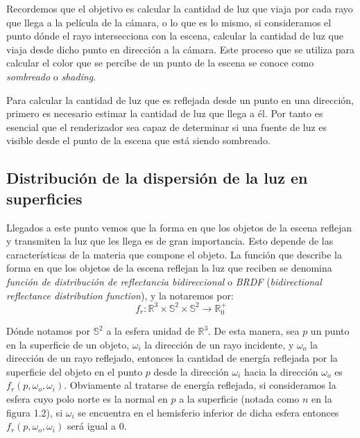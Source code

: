 Recordemos que el objetivo es calcular la cantidad de luz que viaja por cada rayo que llega a la película de la cámara, o lo que es lo mismo, si consideramos el punto dónde el rayo intersecciona con la escena, calcular la cantidad de luz que viaja desde dicho punto en dirección a la cámara. Este proceso que se utiliza para calcular el color que se percibe de un punto de la escena se conoce como \emph{sombreado} o \emph{shading}.

Para calcular la cantidad de luz que es reflejada desde un punto en una dirección, primero es necesario estimar la cantidad de luz que llega a él. Por tanto es esencial que el renderizador sea capaz de determinar si una fuente de luz es visible desde el punto de la escena que está siendo sombreado.

\subsection{Distribución de la dispersión de la luz en superficies}

Llegados a este punto vemos que la forma en que los objetos de la escena reflejan y transmiten la luz que les llega es de gran importancia. Esto depende de las características de la materia que compone el objeto. La función que describe la forma en que los objetos de la escena reflejan la luz que reciben se denomina \emph{función de distribución de reflectancia bidireccional} o \emph{BRDF} (\emph{bidirectional reflectance distribution function}), y la notaremos por:
$$f_r:\mathds{R}^3\times \mathds{S}^2 \times \mathds{S}^2 \rightarrow \mathds{R}^+_0$$

Dónde notamos por $\mathds{S}^2$ a la esfera unidad de $\mathds{R}^3$. De esta manera, sea $p$ un punto en la superficie de un objeto, $\omega _i$ la dirección de un rayo incidente, y $\omega _o$ la dirección de un rayo reflejado, entonces la cantidad de energía reflejada por la superficie del objeto en el punto $p$ desde la dirección $\omega _i$ hacia la dirección $\omega _o$ es $f_r(p,\omega _o, \omega _i)$. Obviamente al tratarse de energía reflejada, si consideramos la esfera cuyo polo norte es la normal en $p$ a la superficie (notada como $n$ en la figura 1.2), si $\omega _i$ se encuentra en el hemisferio inferior de dicha esfera entonces $f_r(p,\omega _o, \omega _i)$ será igual a 0.\\

